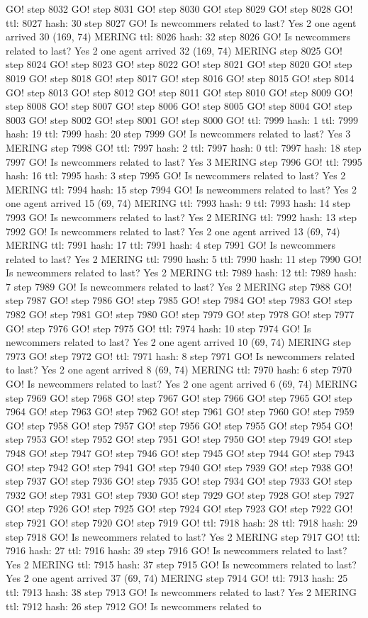 GO! step 8032 GO! step 8031 GO! step 8030 GO! step 8029 GO! step 8028 GO! ttl: 8027 hash: 30 step 8027 GO! Is newcommers related to last? Yes 2 one agent arrived 30 (169, 74) MERING ttl: 8026 hash: 32 step 8026 GO! Is newcommers related to last? Yes 2 one agent arrived 32 (169, 74) MERING step 8025 GO! step 8024 GO! step 8023 GO! step 8022 GO! step 8021 GO! step 8020 GO! step 8019 GO! step 8018 GO! step 8017 GO! step 8016 GO! step 8015 GO! step 8014 GO! step 8013 GO! step 8012 GO! step 8011 GO! step 8010 GO! step 8009 GO! step 8008 GO! step 8007 GO! step 8006 GO! step 8005 GO! step 8004 GO! step 8003 GO! step 8002 GO! step 8001 GO! step 8000 GO! ttl: 7999 hash: 1 ttl: 7999 hash: 19 ttl: 7999 hash: 20 step 7999 GO! Is newcommers related to last? Yes 3 MERING step 7998 GO! ttl: 7997 hash: 2 ttl: 7997 hash: 0 ttl: 7997 hash: 18 step 7997 GO! Is newcommers related to last? Yes 3 MERING step 7996 GO! ttl: 7995 hash: 16 ttl: 7995 hash: 3 step 7995 GO! Is newcommers related to last? Yes 2 MERING ttl: 7994 hash: 15 step 7994 GO! Is newcommers related to last? Yes 2 one agent arrived 15 (69, 74) MERING ttl: 7993 hash: 9 ttl: 7993 hash: 14 step 7993 GO! Is newcommers related to last? Yes 2 MERING ttl: 7992 hash: 13 step 7992 GO! Is newcommers related to last? Yes 2 one agent arrived 13 (69, 74) MERING ttl: 7991 hash: 17 ttl: 7991 hash: 4 step 7991 GO! Is newcommers related to last? Yes 2 MERING ttl: 7990 hash: 5 ttl: 7990 hash: 11 step 7990 GO! Is newcommers related to last? Yes 2 MERING ttl: 7989 hash: 12 ttl: 7989 hash: 7 step 7989 GO! Is newcommers related to last? Yes 2 MERING step 7988 GO! step 7987 GO! step 7986 GO! step 7985 GO! step 7984 GO! step 7983 GO! step 7982 GO! step 7981 GO! step 7980 GO! step 7979 GO! step 7978 GO! step 7977 GO! step 7976 GO! step 7975 GO! ttl: 7974 hash: 10 step 7974 GO! Is newcommers related to last? Yes 2 one agent arrived 10 (69, 74) MERING step 7973 GO! step 7972 GO! ttl: 7971 hash: 8 step 7971 GO! Is newcommers related to last? Yes 2 one agent arrived 8 (69, 74) MERING ttl: 7970 hash: 6 step 7970 GO! Is newcommers related to last? Yes 2 one agent arrived 6 (69, 74) MERING step 7969 GO! step 7968 GO! step 7967 GO! step 7966 GO! step 7965 GO! step 7964 GO! step 7963 GO! step 7962 GO! step 7961 GO! step 7960 GO! step 7959 GO! step 7958 GO! step 7957 GO! step 7956 GO! step 7955 GO! step 7954 GO! step 7953 GO! step 7952 GO! step 7951 GO! step 7950 GO! step 7949 GO! step 7948 GO! step 7947 GO! step 7946 GO! step 7945 GO! step 7944 GO! step 7943 GO! step 7942 GO! step 7941 GO! step 7940 GO! step 7939 GO! step 7938 GO! step 7937 GO! step 7936 GO! step 7935 GO! step 7934 GO! step 7933 GO! step 7932 GO! step 7931 GO! step 7930 GO! step 7929 GO! step 7928 GO! step 7927 GO! step 7926 GO! step 7925 GO! step 7924 GO! step 7923 GO! step 7922 GO! step 7921 GO! step 7920 GO! step 7919 GO! ttl: 7918 hash: 28 ttl: 7918 hash: 29 step 7918 GO! Is newcommers related to last? Yes 2 MERING step 7917 GO! ttl: 7916 hash: 27 ttl: 7916 hash: 39 step 7916 GO! Is newcommers related to last? Yes 2 MERING ttl: 7915 hash: 37 step 7915 GO! Is newcommers related to last? Yes 2 one agent arrived 37 (69, 74) MERING step 7914 GO! ttl: 7913 hash: 25 ttl: 7913 hash: 38 step 7913 GO! Is newcommers related to last? Yes 2 MERING ttl: 7912 hash: 26 step 7912 GO! Is newcommers related to 